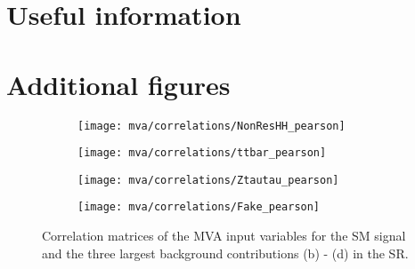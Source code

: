 \chapter{Useful information}
\label{sec:app}



\chapter{Additional figures}
\label{sec:app_additional_figures}


\begin{figure}[htbp]
  \centering

  \begin{subfigure}[t]{.49\textwidth}
    \texttt{[image: mva/correlations/NonResHH\_pearson]}
  \end{subfigure}\hfill %
  \begin{subfigure}[t]{.49\textwidth}
    \texttt{[image: mva/correlations/ttbar\_pearson]}
    \subcaption{\ttbar}
  \end{subfigure}

  \begin{subfigure}[t]{.49\textwidth}
    \texttt{[image: mva/correlations/Ztautau\_pearson]}
  \end{subfigure}\hfill %
  \begin{subfigure}[t]{.49\textwidth}
    \texttt{[image: mva/correlations/Fake\_pearson]}
  \end{subfigure}

  \caption{Correlation matrices of the MVA input variables for the SM
    \HH signal and the three largest background contributions (b) -
    (d) in the \hadhad SR.}
  \label{fig:mva_input_correlations}
\end{figure}


